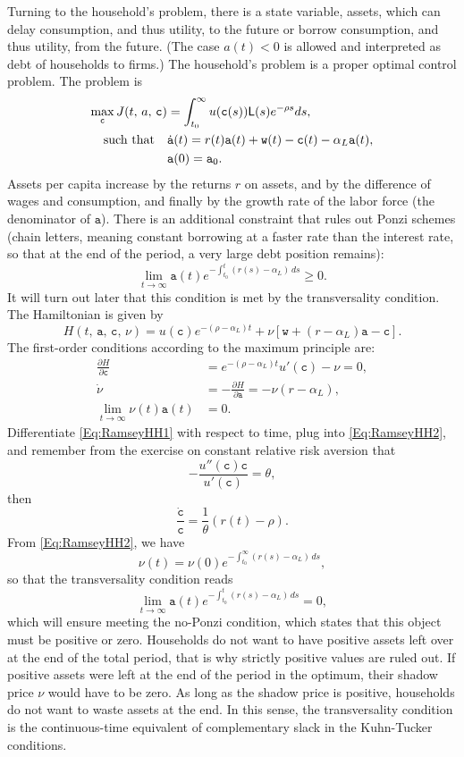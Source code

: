 \documentclass[graybox]{svmult}
\begin{document}
Turning to the household's problem, there is a state variable, assets, which can delay consumption, and thus utility, to the future or borrow consumption, and thus utility, from the future. (The case $a(t)<0$ is allowed and interpreted as debt of households to firms.)  The household's problem is a proper optimal control problem. The problem is
\begin{align*}
\max_{\mathtt{c}} J(t,\, a,\, \mathtt{c}) &= \int_{t_0}^\infty u(\mathtt{c}(s)) \mathsf{L}(s) e^{-\rho s} ds,\\
\mbox{\rm such that} \quad &\dot{\mathtt{a}}(t) = r(t)\mathtt{a}(t) + \mathtt{w}(t) - \mathtt{c}(t) -\alpha_L \mathtt{a}(t),\\
 & \mathtt{a}(0) = \mathtt{a}_0.
\end{align*}
Assets per capita increase by the returns $r$ on assets, and by the difference of wages and consumption, and finally by the growth rate of the labor force (the denominator of $\mathtt{a}$).  There is an additional constraint that rules out Ponzi schemes (chain letters, meaning constant borrowing at a faster rate than the interest rate, so that at the end of the period, a very large debt position remains):
\[
\lim_{t\to\infty} \mathtt{a}(t) e^{-\int_{t_0}^t (r(s)-\alpha_L)\, ds} \ge 0.
\]
It will turn out later that this condition is met by the transversality condition.  The Hamiltonian is given by
\[
H(t,\, \mathtt{a},\, \mathtt{c},\, \nu) = u(\mathtt{c}) e^{-(\rho-\alpha_L)t} + \nu \left[ \mathtt{w} + (r-\alpha_L)\mathtt{a} - \mathtt{c} \right].
\]
The first-order conditions according to the maximum principle are:
\begin{align}
\frac{\partial H}{\partial \mathtt{c}} &= e^{-(\rho-\alpha_L)t} u'(\mathtt{c}) - \nu = 0,\label{Eq:RamseyHH1}\\
\dot{\nu} &= -\frac{\partial H}{\partial\mathtt{a}} = -\nu(r-\alpha_L),\label{Eq:RamseyHH2}\\
\lim_{t\to\infty}  \nu(t)\mathtt{a}(t) &= 0.\label{Eq:RamseyHH3}
\end{align}
Differentiate \eqref{Eq:RamseyHH1} with respect to time, plug into \eqref{Eq:RamseyHH2}, and remember from the exercise on constant relative risk aversion that
\[
-\frac{u''(\mathtt{c}) \mathtt{c}}{u'(\mathtt{c})} = \theta,
\]
then
\begin{equation}\label{Eq:RamseyHH4}
\frac{\dot{\mathtt{c}}}{\mathtt{c}} = \frac{1}{\theta}(r(t)-\rho).
\end{equation}
From \eqref{Eq:RamseyHH2}, we have
\[
\nu(t) = \nu(0) e^{-\int_{t_0}^\infty (r(s)-\alpha_L)\, ds},
\]
so that the transversality condition reads
\[
\lim_{t\to\infty} \mathtt{a}(t) e^{-\int_{t_0}^t (r(s)-\alpha_L)\, ds} = 0,
\]
which will ensure meeting the no-Ponzi condition, which states that this object must be positive or zero.  Households do not want to have positive assets left over at the end of the total period, that is why strictly positive values are ruled out.  If positive assets were left at the end of the period in the optimum, their shadow price $\nu$ would have to be zero. As long as the shadow price is positive, households do not want to waste assets at the end.  In this sense, the transversality condition is the continuous-time equivalent of complementary slack in the Kuhn-Tucker conditions.
\end{document}
